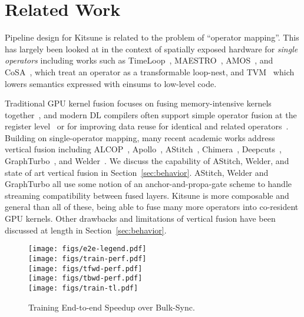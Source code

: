 \section{Related Work}
\label{sec:relwork}

 Pipeline design for Kitsune is related to the problem of ``operator mapping''. This has largely been looked at in the context of spatially exposed hardware for \textit{single operators} including works such as TimeLoop~\cite{parashar2019timeloop}, MAESTRO~\cite{maestro}, AMOS~\cite{zheng2022amos}, and CoSA~\cite{huang_cosa_2021}, which treat an operator as a transformable loop-nest, and TVM~\cite{chen2018tvm} which lowers semantics expressed with einsums to low-level code. 

 Traditional GPU kernel fusion focuses on fusing memory-intensive kernels together~\cite{qiao2018automatic, wahib2014scalable,wu2012kernel,qiao2019loop}, and modern DL compilers often support simple operator fusion at the register level~\cite{zheng2020ansor, dnnfusion:pldi2021, RAMMER:OSDI2020} or for improving data reuse for identical and related operators~\cite{wang2020accelerating,sivathanu2019astra,jia2019taso}.
Building on single-operator mapping, many recent academic works address vertical fusion including ALCOP~\cite{huang2023alcop}, Apollo~\cite{zhao2022apollo}, AStitch~\cite{zheng2022astitch},   Chimera~\cite{zheng2023chimera}, Deepcuts~\cite{jung2021deepcuts}, GraphTurbo~\cite{zhao2023effectively}, and Welder~\cite{shi2023welder}. We discuss the capability of AStitch, Welder, and state of art vertical fusion in Section~\ref{sec:behavior}. AStitch, Welder and GraphTurbo all use some notion of an anchor-and-propa-gate scheme to handle streaming compatibility between fused layers. Kitsune is more composable and general than all of these, being able to fuse many more operators into co-resident GPU kernels. Other drawbacks and limitations of vertical fusion have been discussed at length in Section~\ref{sec:behavior}.


\begin{figure}[t]
    \centering
    \hspace{0.5in}
    \texttt{[image: figs/e2e-legend.pdf]} \\
    \texttt{[image: figs/train-perf.pdf]} \\
    \vspace{0.1in}
    \texttt{[image: figs/tfwd-perf.pdf]} \\
    \vspace{0.1in}
    \texttt{[image: figs/tbwd-perf.pdf]} \\
    \vspace{0.1in}
    \texttt{[image: figs/train-tl.pdf]} \\
    \vspace{-0.1in}
    \caption{Training End-to-end Speedup over Bulk-Sync.}
    \label{fig:train-perf-tl}
    \vspace{-0.2in}
\end{figure}   

